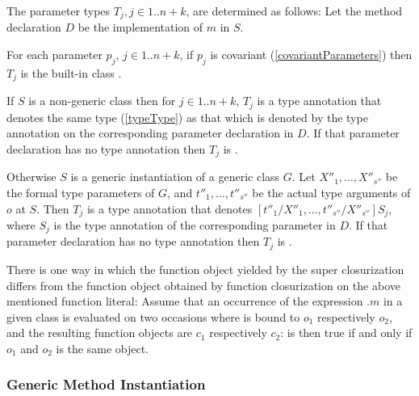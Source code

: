 \documentclass[makeidx]{article}
\begin{document}
{\LMHash{}%
The parameter types $T_j, j \in 1 .. n+k$, are determined as follows:
Let the method declaration $D$ be the implementation of $m$ in $S$.

\LMHash{}%
For each parameter $p_j$, $j \in 1 .. n+k$, if $p_j$ is covariant
(\ref{covariantParameters})
then $T_j$ is the built-in class .


\LMHash{}%
If $S$ is a non-generic class then for $j \in 1 .. n+k$,
$T_j$ is a type annotation that denotes the same type
(\ref{typeType})
as that which is denoted by the type annotation on
the corresponding parameter declaration in $D$.
If that parameter declaration has no type annotation then $T_j$ is \DYNAMIC.

\LMHash{}%
Otherwise $S$ is a generic instantiation of a generic class $G$.
Let $X''_1, \ldots, X''_{s''}$ be the formal type parameters of $G$,
and $t''_1, \ldots, t''_{s''}$ be the actual type arguments of $o$ at $S$.
Then $T_j$ is a type annotation that denotes
$[t''_1/X''_1, \ldots, t''_{s''}/X''_{s''}]S_j$,
where $S_j$ is the type annotation of the corresponding parameter in $D$.
If that parameter declaration has no type annotation then $T_j$ is \DYNAMIC.

\LMHash{}%
There is one way in which
the function object yielded by the super closurization differs from
the function object obtained by function closurization on
the above mentioned function literal:
Assume that an occurrence of the expression \SUPER.$m$ in a given class
is evaluated on two occasions where \THIS{}
is bound to $o_1$ respectively $o_2$,
and the resulting function objects are $c_1$ respectively $c_2$:
 is then true
if and only if $o_1$ and $o_2$ is the same object.


\subsubsection{Generic Method Instantiation}


}
\end{document}
